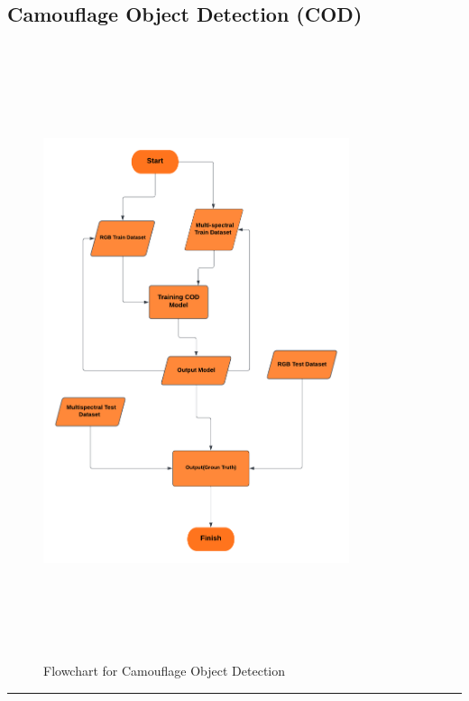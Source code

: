 \subsection{{{\fontsize{14}{19}\selectfont \textbf{Camouflage Object Detection (COD)}}}}
\vspace{1cm}
\begin{figure}[h]
  \centering
  \includegraphics[width=0.8\textwidth,height=18cm]{sections/LBP/COD - Page 1.png}
  \caption{Flowchart for Camouflage Object Detection}
  \label{fig:figure_label}
\end{figure}

\vspace{0.5cm}
{\color{gray}\hrule}
\vspace{0.5cm}
\newpage
